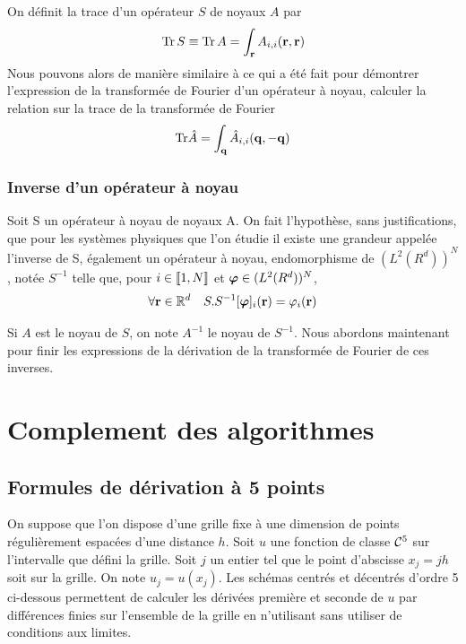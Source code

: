 \documentclass[10pt]{article}
\begin{document}
\begin{multicols}{2}
On définit la trace d'un opérateur $S$ de noyaux $A$ par
\begin{equation}
  \text{Tr}\, S \equiv \text{Tr} \, A = \int_{{\bf r}} A_{i,i}({\bf r},{\bf r}) 
\end{equation}
Nous pouvons alors de manière similaire à ce qui a été fait pour démontrer l'expression de la transformée de Fourier d'un opérateur à noyau, calculer la relation sur la trace de la transformée de Fourier
\begin{equation}
  \text{Tr} \hat{A} =  \int_{{\bf q}} \hat{A}_{i,i}({\bf q},-{\bf q}) 
 \end{equation}



\vspace*{11pt}



\subsubsection{Inverse d'un opérateur à noyau}

Soit S un opérateur à noyau de noyaux A. On fait l'hypothèse, sans justifications, que pour les systèmes physiques que l'on étudie il existe une grandeur appelée l'inverse de S, également un opérateur à noyau, endomorphisme de $(L^2(R^d))^N$, notée $S^{-1}$ telle que, pour $i \in  \llbracket 1,N \rrbracket $ et $\boldsymbol{ \varphi} \in (L^2(R^d))^N$, 
\begin{equation}
	\forall {\bf r} \in \mathbb{R}^d \quad S.S^{-1}[\boldsymbol{ \varphi}]_i({\bf r}) = \varphi_i ({\bf r})	
\end{equation}

Si $A$ est le noyau de $S$, on note $A^{-1}$ le noyau de $S^{-1}$.
Nous abordons maintenant pour finir les expressions de la dérivation de la transformée de Fourier de ces inverses.

\end{multicols}



\pagebreak


\section{Complement des algorithmes}

\subsection{Formules de dérivation à 5 points}


On suppose que l'on dispose d'une grille fixe à une dimension de points régulièrement espacées d'une distance $h$. Soit $u$ une fonction de classe $\mathcal{C}^5$ sur l'intervalle que défini la grille. Soit $j$ un entier tel que le point d'abscisse $x_j = jh$ soit sur la grille. On note $u_j = u(x_j)$. Les schémas centrés et décentrés d'ordre 5 ci-dessous permettent de calculer les dérivées première et seconde de $u$ par différences finies sur l'ensemble de la grille en n'utilisant sans utiliser de conditions aux limites. \\
\end{document}
